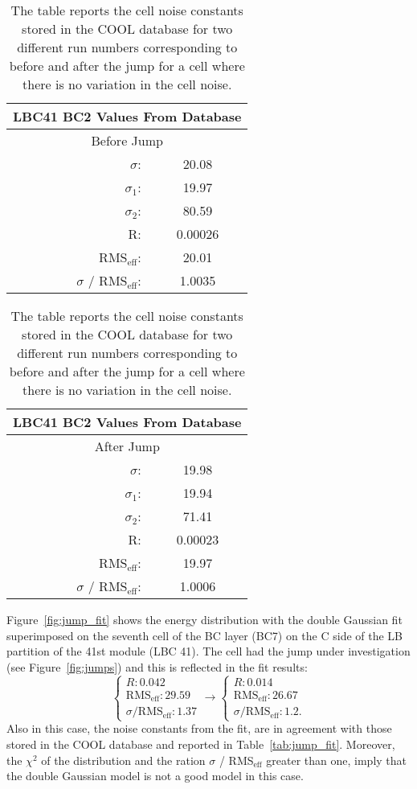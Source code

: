 \begin{table}[!h]
  \centering
  \begin{tabular}{r c}
    \multicolumn{2}{c}{LBC41 BC2 Values From Database} \\
    \hline \hline
    \multicolumn{2}{c}{Before Jump} \\
    \hline \hline
    $\sigma$: & 20.08 \\
    $\sigma_1$: & 19.97 \\
    $\sigma_2$: & 80.59 \\
    R\@: & 0.00026 \\
    RMS$_\text{eff}$: & 20.01 \\
    $\sigma$ / RMS$_\text{eff}$: & 1.0035 \\
    \hline \hline
  \end{tabular} \quad
  \begin{tabular}{r c}
    \multicolumn{2}{c}{LBC41 BC2 Values From Database} \\
    \hline \hline
    \multicolumn{2}{c}{After Jump} \\
    \hline \hline
    $\sigma$: & 19.98 \\
    $\sigma_1$: & 19.94 \\
    $\sigma_2$: & 71.41 \\
    R\@: & 0.00023 \\
    RMS$_\text{eff}$: & 19.97 \\
    $\sigma$ / RMS$_\text{eff}$: & 1.0006 \\
    \hline \hline
  \end{tabular}
  \caption{The table reports the cell noise constants stored in the COOL
    database for two different run numbers corresponding to before and after the
  jump for a cell where there is no variation in the cell noise.}
\label{tab:no_jump_fit}
\end{table}

Figure~\ref{fig:jump_fit} shows the energy distribution with the double Gaussian
fit superimposed on the seventh cell of the BC layer (BC7) on the C side of the
LB partition of the 41st module (LBC 41). The cell had the jump under
investigation (see Figure~\ref{fig:jumps}) and this is reflected in the fit results:
\begin{equation}
  \label{eq:75}
  \begin{cases}
    R : 0.042 \\
    \text{RMS}_{\text{eff}}: 29.59 \\
    \sigma / \text{RMS}_{\text{eff}}: 1.37
  \end{cases}
  \to
  \begin{cases}
    R : 0.014 \\
    \text{RMS}_\text{{eff}} : 26.67 \\
    \sigma / \text{RMS}_{\text{eff}}: 1.2.
  \end{cases}
\end{equation}
Also in this case, the noise constants from the fit, are in agreement with those
stored in the COOL database and reported in  Table~\ref{tab:jump_fit}. Moreover,
the $\chi^2$ of the distribution and the ration $\sigma$ / RMS$_{\text{eff}}$
greater than one, imply that the double Gaussian model is not a good model in
this case.

